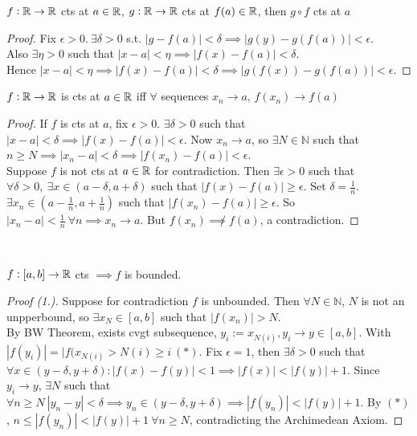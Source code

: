 \begin{theorem}
	$f:\mathbb{R} \to \mathbb{R}$ cts at $a \in \mathbb{R}$, $g:\mathbb{R} \to \mathbb{R}$ cts at $f(a) \in \mathbb{R}$, then $g \circ f$ cts at $a$
\end{theorem}
\begin{proof}
Fix $\epsilon >0.~ \exists \delta > 0$ s.t. $|g - f(a)| < \delta \implies |g(y) - g(f(a))| < \epsilon$.\\
Also $\exists \eta > 0$ such that $|x-a| < \eta \implies |f(x) - f(a)| < \delta$.\\

\noindent Hence $|x-a| < \eta \implies |f(x) - f(a)| < \delta \implies |g(f(x)) - g(f(a))| < \epsilon.$
\end{proof}\vspace*{5pt}

\begin{theorem}
	$f: \mathbb{R} \to \mathbb{R}$ is cts at $a \in \mathbb{R}$ iff $\forall$ sequences $x_n \to a$, $f(x_n) \to f(a)$
\end{theorem}
\begin{proof}
If $f$ is cts at $a$, fix $\epsilon >0$. $\exists \delta > 0$ such that $|x-a| < \delta \implies |f(x) - f(a)| < \epsilon$. Now $x_n \to a$, so $\exists N \in \mathbb{N}$ such that $n \geq N \implies |x_n - a| < \delta \implies |f(x_n) - f(a)| < \epsilon$.\\

\noindent Suppose $f$ is not cts at $a\in \mathbb{R}$ for contradiction. Then $\exists \epsilon >0$ such that $\forall \delta >0,~\exists x \in (a-\delta,a+\delta)$ such that $|f(x) -f(a)| \geq \epsilon.$ Set $\delta = \frac{1}{n}$. $\exists x_n \in (a - \frac{1}{n},a + \frac{1}{n})$ such that $|f(x_n) - f(a)| \geq \epsilon$. So $|x_n-a| < \frac{1}{n}~\forall n \implies x_n \to a$. But $f(x_n) \not\implies f(a)$, a contradiction.  
\end{proof}~


\begin{theorem}
$f:[a,b] \to \mathbb{R}$ cts $\implies f$ is bounded.	
\end{theorem}
\begin{proof}[Proof (1.)]
Suppose for contradiction $f$ is unbounded. Then $\forall N \in \mathbb{N}$, $N$ is not an unpperbound, so $\exists x_N \in [a,b]$ such that $|f(x_n)| > N$.\\
By BW Theorem, exists cvgt subsequence, $y_i := x_{N(i)}, y_i \to y \in [a,b]$. With $|f(y_i)| = |f(x_{N(i)} > N(i) \geq i ~(*)$. Fix $\epsilon =1$, then $\exists \delta > 0$ such that $\forall x \in (y-\delta, y + \delta): |f(x) - f(y)| < 1 \implies |f(x)| < |f(y)| +1.$ Since $y_i \to y$, $\exists N$ such that $\forall n \geq N~ |y_n - y| < \delta \implies y_n \in (y-\delta, y + \delta) \implies |f(y_n)| < |f(y)| + 1.$ By $(*)$, $n \leq |f(y_n)| < |f(y)| + 1~ \forall n \geq N$, contradicting the Archimedean Axiom.
	
\end{proof}\vspace*{5pt}


